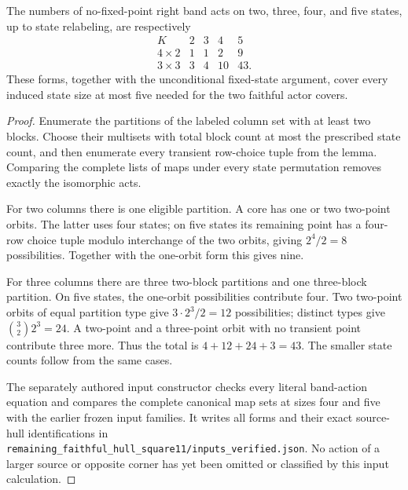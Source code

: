 \begin{proposition}
\label{CP2:A-remaining-hulls-small-band-forms}
The numbers of no-fixed-point right band acts on two,
three, four, and five states, up to state relabeling,
are respectively
\[
\begin{array}{c|rrrr}
K&2&3&4&5\\\hline
4\times2&1&1&2&9\\
3\times3&3&4&10&43.
\end{array}
\]
These forms, together with the unconditional fixed-state
argument, cover every induced state size at most five
needed for the two faithful actor covers.
\end{proposition}
\begin{proof}
Enumerate the partitions of the labeled column set with
at least two blocks.  Choose their multisets with total
block count at most the prescribed state count, and then
enumerate every transient row-choice tuple from the
lemma.  Comparing the complete lists of maps under every
state permutation removes exactly the isomorphic acts.

For two columns there is one eligible partition.  A core
has one or two two-point orbits.  The latter uses four
states; on five states its remaining point has a
four-row choice tuple modulo interchange of the two
orbits, giving $2^4/2=8$ possibilities.  Together with
the one-orbit form this gives nine.

For three columns there are three two-block partitions
and one three-block partition.  On five states, the
one-orbit possibilities contribute four.  Two two-point
orbits of equal partition type give $3\cdot2^3/2=12$
possibilities; distinct types give
$\binom32 2^3=24$.  A two-point and a three-point orbit
with no transient point contribute three more.  Thus
the total is $4+12+24+3=43$.  The smaller state counts
follow from the same cases.

The separately authored input constructor checks every
literal band-action equation and compares the complete
canonical map sets at sizes four and five with the
earlier frozen input families.  It writes all forms and
their exact source-hull identifications in
\texttt{remaining\_faithful\_hull\_square11/inputs\_verified.json}.
No action of a larger source or opposite corner has yet
been omitted or classified by this input calculation.
\end{proof}
